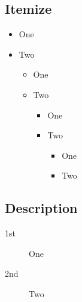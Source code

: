 \documentclass{article}
\begin{document}
        \subsection{Itemize}
            \begin{itemize}
                \item One \textbullet
                \item Two \textbullet
                \begin{itemize}
                    \item One {\normalfont\bfseries \textendash}
                    \item Two {\normalfont\bfseries \textendash}
                    \begin{itemize}
                        \item One \textasteriskcentered
                        \item Two \textasteriskcentered
                        \begin{itemize}
                            \item One \textperiodcentered
                            \item Two \textperiodcentered
                        \end{itemize}
                    \end{itemize}
                \end{itemize}
            \end{itemize}
        \subsection{Description}
            \renewcommand\descriptionlabel[1]{\normalfont\Large\itshape\textbullet #1}
            \begin{description}
                \item[1st] One
                \item[2nd] Two  
            \end{description}
\end{document}
